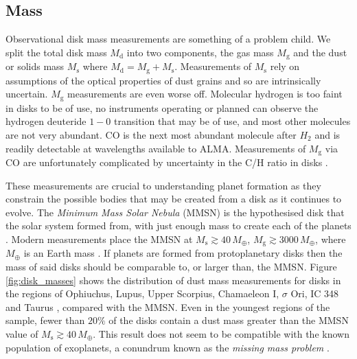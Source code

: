 \subsection{Mass}

Observational disk mass measurements are something of a problem child.
We split the total disk mass $M_\mathrm{d}$ into two components, the gas mass $M_\mathrm{g}$  and the dust or solids mass $M_\mathrm{s}$ where $M_\mathrm{d} = M_\mathrm{g} + M_\mathrm{s}$.
Measurements of $M_\mathrm{s}$ rely on assumptions of the optical properties of dust grains and so are intrinsically uncertain.
$M_\mathrm{g}$ measurements are even worse off.
Molecular hydrogen is too faint in disks to be of use, no instruments operating or planned can observe the hydrogen deuteride $1-0$ transition that may be of use, and most other molecules are not very abundant.
CO is the next most abundant molecule after $H_2$ and is readily detectable at wavelengths available to ALMA.
Measurements of $M_\mathrm{g}$ via CO are unfortunately complicated by uncertainty in the C/H ratio in disks \citep[see the review by][for in-depth discussion of difficulties with disk mass measurements]{miotello2022}.

These measurements are crucial to understanding planet formation as they constrain the possible bodies that may be created from a disk as it continues to evolve.
The \textit{Minimum Mass Solar Nebula} (MMSN) is the hypothesised disk that the solar system formed from, with just enough mass to create each of the planets \citep{weidenschilling1977b,hayashi1981}.
Modern measurements place the MMSN at $M_\mathrm{s} \gtrsim 40 \, M_\oplus$, $M_\mathrm{g} \gtrsim 3000 \, M_\oplus$, where $M_\oplus$ is an Earth mass \citep[see review by][]{andrews2020}.
If planets are formed from protoplanetary disks then the mass of said disks should be comparable to, or larger than, the MMSN.
Figure \ref{fig:disk_masses} shows the distribution of dust mass measurements for disks in the regions of Ophiuchus, Lupus, Upper Scorpius, Chamaeleon I, $\sigma$ Ori, IC 348 and Taurus \citep[and references therin]{cieza2019}, compared with the MMSN.
Even in the youngest regions of the sample, fewer than $20\%$ of the disks contain a dust mass greater than the MMSN value of $M_\mathrm{s}\gtrsim 40 \, M_\oplus$.
This result does not seem to be compatible with the known population of exoplanets, a conundrum known as the \textit{missing mass problem} \citep[eg.]{najita2014}.

